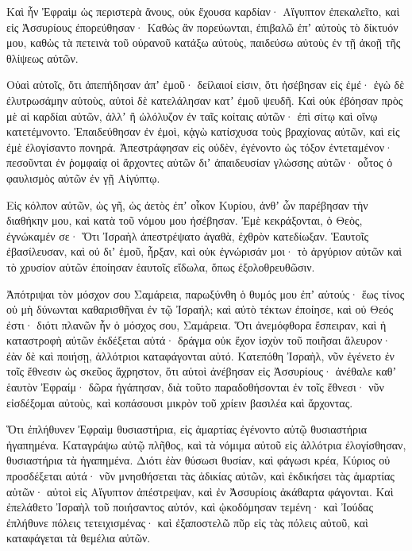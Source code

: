\begin{spacing}{1.1}
\begin{multicols}{2}
Καὶ ἦν Ἐφραὶμ ὡς περιστερὰ ἄνους, οὐκ ἔχουσα καρδίαν· Αἴγυπτον ἐπεκαλεῖτο, καὶ εἰς Ἀσσυρίους ἐπορεύθησαν·
Καθὼς ἂν πορεύωνται, ἐπιβαλῶ ἐπʼ αὐτοὺς τὸ δίκτυόν μου, καθὼς τὰ πετεινὰ τοῦ οὐρανοῦ κατάξω αὐτοὺς, παιδεύσω αὐτοὺς ἐν τῇ ἀκοῇ τῆς θλίψεως αὐτῶν.

Οὐαὶ αὐτοῖς, ὅτι ἀπεπήδησαν ἀπʼ ἐμοῦ· δείλαιοί εἰσιν, ὅτι ἠσέβησαν εἰς ἐμέ· ἐγὼ δὲ ἐλυτρωσάμην αὐτοὺς, αὐτοὶ δὲ κατελάλησαν κατʼ ἐμοῦ ψευδῆ.
Καὶ οὐκ ἐβόησαν πρὸς μὲ αἱ καρδίαι αὐτῶν, ἀλλʼ ἢ ὠλόλυζον ἐν ταῖς κοίταις αὐτῶν· ἐπὶ σίτῳ καὶ οἴνῳ κατετέμνοντο.
Ἐπαιδεύθησαν ἐν ἐμοὶ, κᾀγὼ κατίσχυσα τοὺς βραχίονας αὐτῶν, καὶ εἰς ἐμὲ ἐλογίσαντο πονηρά.
Ἀπεστράφησαν εἰς οὐδὲν, ἐγένοντο ὡς τόξον ἐντεταμένον· πεσοῦνται ἐν ῥομφαίᾳ οἱ ἄρχοντες αὐτῶν διʼ ἀπαιδευσίαν γλώσσης αὐτῶν· οὗτος ὁ φαυλισμὸς αὐτῶν ἐν γῇ Αἰγύπτῳ.

Εἰς κόλπον αὐτῶν, ὡς γῆ, ὡς ἀετὸς ἐπʼ οἶκον Κυρίου, ἀνθʼ ὧν παρέβησαν τὴν διαθήκην μου, καὶ κατὰ τοῦ νόμου μου ἠσέβησαν.
Ἐμὲ κεκράξονται, ὁ Θεὸς, ἐγνώκαμέν σε·
Ὅτι Ἰσραὴλ ἀπεστρέψατο ἀγαθὰ, ἐχθρὸν κατεδίωξαν.
Ἑαυτοῖς ἐβασίλευσαν, καὶ οὐ διʼ ἐμοῦ, ἦρξαν, καὶ οὐκ ἐγνώρισάν μοι· τὸ ἀργύριον αὐτῶν καὶ τὸ χρυσίον αὐτῶν ἐποίησαν ἑαυτοῖς εἴδωλα, ὅπως ἐξολοθρευθῶσιν.

Ἀπότριψαι τὸν μόσχον σου Σαμάρεια, παρωξύνθη ὁ θυμός μου ἐπʼ αὐτούς· ἕως τίνος οὐ μὴ δύνωνται καθαρισθῆναι
ἐν τῷ Ἰσραήλ; καὶ αὐτὸ τέκτων ἐποίησε, καὶ οὐ Θεός ἐστι· διότι πλανῶν ἦν ὁ μόσχος σου, Σαμάρεια.
Ὅτι ἀνεμόφθορα ἔσπειραν, καὶ ἡ καταστροφὴ αὐτῶν ἐκδέξεται αὐτά· δράγμα οὐκ ἔχον ἰσχὺν τοῦ ποιῆσαι ἄλευρον· ἐὰν δὲ καὶ ποιήσῃ, ἀλλότριοι καταφάγονται αὐτό.
Κατεπόθη Ἰσραὴλ, νῦν ἐγένετο ἐν τοῖς ἔθνεσιν ὡς σκεῦος ἄχρηστον,
ὅτι αὐτοὶ ἀνέβησαν εἰς Ἀσσυρίους· ἀνέθαλε καθʼ ἑαυτὸν Ἐφραίμ· δῶρα ἠγάπησαν,
διὰ τοῦτο παραδοθήσονται ἐν τοῖς ἔθνεσι· νῦν εἰσδέξομαι αὐτοὺς, καὶ κοπάσουσι μικρὸν τοῦ χρίειν βασιλέα καὶ ἄρχοντας.

Ὅτι ἐπλήθυνεν Ἐφραὶμ θυσιαστήρια, εἰς ἁμαρτίας ἐγένοντο αὐτῷ θυσιαστήρια ἠγαπημένα.
Καταγράψω αὐτῷ πλῆθος, καὶ τὰ νόμιμα αὐτοῦ εἰς ἀλλότρια ἐλογίσθησαν, θυσιαστήρια τὰ ἠγαπημένα.
Διότι ἐὰν θύσωσι θυσίαν, καὶ φάγωσι κρέα, Κύριος οὐ προσδέξεται αὐτά· νῦν μνησθήσεται τὰς ἀδικίας αὐτῶν, καὶ ἐκδικήσει τὰς ἁμαρτίας αὐτῶν· αὐτοὶ εἰς Αἴγυπτον ἀπέστρεψαν, καὶ ἐν Ἀσσυρίοις ἀκάθαρτα φάγονται.
Καὶ ἐπελάθετο Ἰσραὴλ τοῦ ποιήσαντος αὐτόν, καὶ ᾠκοδόμησαν τεμένη· καὶ Ἰούδας ἐπλήθυνε πόλεις τετειχισμένας· καὶ ἐξαποστελῶ πῦρ εἰς τὰς πόλεις αὐτοῦ, καὶ καταφάγεται τὰ θεμέλια αὐτῶν.


\end{multicols}
\end{spacing}
